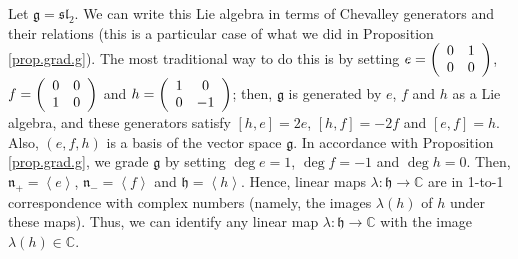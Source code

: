 \documentclass[etingof-lie.tex]{subfiles}
\begin{document}
\begin{example}
\label{exa.sl2}Let $\mathfrak{g}=\mathfrak{sl}_{2}$. We can write this Lie
algebra in terms of Chevalley generators and their relations (this is a
particular case of what we did in Proposition \ref{prop.grad.g}). The most
traditional way to do this is by setting $e=\left(
\begin{array}
[c]{cc}%
0 & 1\\
0 & 0
\end{array}
\right)  $, $f=\left(
\begin{array}
[c]{cc}%
0 & 0\\
1 & 0
\end{array}
\right)  $ and $h=\left(
\begin{array}
[c]{cc}%
1 & 0\\
0 & -1
\end{array}
\right)  $; then, $\mathfrak{g}$ is generated by $e$, $f$ and $h$ as a Lie
algebra, and these generators satisfy $\left[  h,e\right]  =2e$, $\left[
h,f\right]  =-2f$ and $\left[  e,f\right]  =h$. Also, $\left(  e,f,h\right)  $
is a basis of the vector space $\mathfrak{g}$. In accordance with Proposition
\ref{prop.grad.g}, we grade $\mathfrak{g}$ by setting $\deg e=1$, $\deg f=-1$
and $\deg h=0$. Then, $\mathfrak{n}_{+}=\left\langle e\right\rangle $,
$\mathfrak{n}_{-}=\left\langle f\right\rangle $ and $\mathfrak{h}=\left\langle
h\right\rangle $. Hence, linear maps $\lambda:\mathfrak{h}\rightarrow
\mathbb{C}$ are in 1-to-1 correspondence with complex numbers (namely, the
images $\lambda\left(  h\right)  $ of $h$ under these maps). Thus, we can
identify any linear map $\lambda:\mathfrak{h}\rightarrow\mathbb{C}$ with the
image $\lambda\left(  h\right)  \in\mathbb{C}$.


\end{example}
\end{document}
